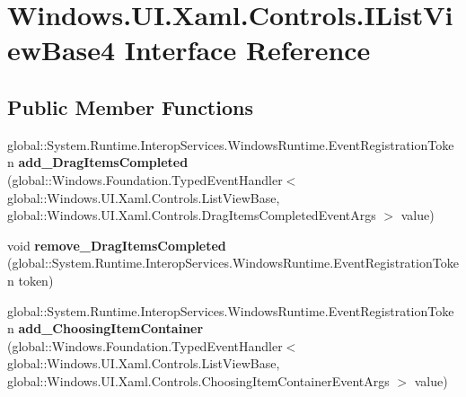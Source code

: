\hypertarget{interface_windows_1_1_u_i_1_1_xaml_1_1_controls_1_1_i_list_view_base4}{}\section{Windows.\+U\+I.\+Xaml.\+Controls.\+I\+List\+View\+Base4 Interface Reference}
\label{interface_windows_1_1_u_i_1_1_xaml_1_1_controls_1_1_i_list_view_base4}
\subsection*{Public Member Functions}
\begin{DoxyCompactItemize}
\item 
\mbox{\label{interface_windows_1_1_u_i_1_1_xaml_1_1_controls_1_1_i_list_view_base4_a8ded6e3ecc87209cec3cfd04f4282042}} 
global\+::\+System.\+Runtime.\+Interop\+Services.\+Windows\+Runtime.\+Event\+Registration\+Token {\bfseries add\+\_\+\+Drag\+Items\+Completed} (global\+::\+Windows.\+Foundation.\+Typed\+Event\+Handler$<$ global\+::\+Windows.\+U\+I.\+Xaml.\+Controls.\+List\+View\+Base, global\+::\+Windows.\+U\+I.\+Xaml.\+Controls.\+Drag\+Items\+Completed\+Event\+Args $>$ value)
\item 
\mbox{\label{interface_windows_1_1_u_i_1_1_xaml_1_1_controls_1_1_i_list_view_base4_aa8eed7aa7eefe8deffed7275d822d4ea}} 
void {\bfseries remove\+\_\+\+Drag\+Items\+Completed} (global\+::\+System.\+Runtime.\+Interop\+Services.\+Windows\+Runtime.\+Event\+Registration\+Token token)
\item 
\mbox{\label{interface_windows_1_1_u_i_1_1_xaml_1_1_controls_1_1_i_list_view_base4_a50b9a86d32b7a6ba60f5162b251de868}} 
global\+::\+System.\+Runtime.\+Interop\+Services.\+Windows\+Runtime.\+Event\+Registration\+Token {\bfseries add\+\_\+\+Choosing\+Item\+Container} (global\+::\+Windows.\+Foundation.\+Typed\+Event\+Handler$<$ global\+::\+Windows.\+U\+I.\+Xaml.\+Controls.\+List\+View\+Base, global\+::\+Windows.\+U\+I.\+Xaml.\+Controls.\+Choosing\+Item\+Container\+Event\+Args $>$ value)
\item 
\mbox{\label{interface_windows_1_1_u_i_1_1_xaml_1_1_controls_1_1_i_list_view_base4_ae03f9cc1626fb8ce344e627e8be05680}} 

\end{DoxyCompactItemize}
